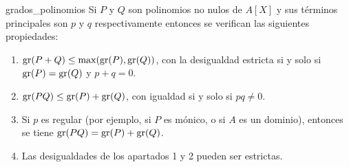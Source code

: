 \begin{lemma}{}{grados_polinomios}
Si $P$ y $Q$ son polinomios no nulos de $A[X]$ y sus términos principales son $p$ y $q$ respectivamente entonces se verifican las siguientes propiedades:

\begin{enumerate}
    \item \(\operatorname{gr}(P + Q) \leq \max(\operatorname{gr}(P), \operatorname{gr}(Q))\), con la desigualdad estricta si y solo si \(\operatorname{gr}(P) = \operatorname{gr}(Q)\) y \(p + q = 0\).
    \item \(\operatorname{gr}(PQ) \leq \operatorname{gr}(P) + \operatorname{gr}(Q)\), con igualdad si y solo si \(pq \neq 0\).
    \item Si \(p\) es regular (por ejemplo, si \(P\) es mónico, o si \(A\) es un dominio), entonces se tiene \(\operatorname{gr}(PQ) = \operatorname{gr}(P) + \operatorname{gr}(Q)\).
    \item Las desigualdades de los apartados 1 y 2 pueden ser estrictas.
\end{enumerate}

\end{lemma}


